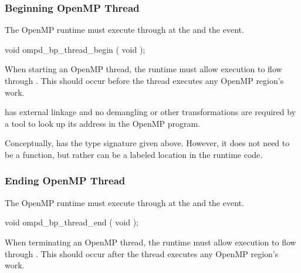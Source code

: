 \subsubsection{Beginning OpenMP Thread}
\label{subsubsec:ompd_bp_thread_begin}

\summary
The OpenMP runtime must execute through
 at the  and the  event.


\begin{cspecific}
\begin{ompSyntax}
void ompd_bp_thread_begin ( void );
\end{ompSyntax}
\end{cspecific}


\descr

When starting an OpenMP thread, the runtime must allow execution
to flow through .
This should occur before the thread executes any OpenMP region's work.

\restrictions

 has external  linkage and no
demangling or other transformations are required by a tool
to look up its address in the OpenMP program.

Conceptually,  has the type signature
given above.
However, it does not need to be a function, but rather can be a labeled location
in the runtime code.

\subsubsection{Ending OpenMP Thread}
\label{subsubsec:ompd_bp_thread_begin}

\summary
The OpenMP runtime must execute through
 at the  and the  event.


\begin{cspecific}
\begin{ompSyntax}
void ompd_bp_thread_end ( void );
\end{ompSyntax}
\end{cspecific}


\descr

When terminating an OpenMP thread, the runtime must allow execution
to flow through .
This should occur after the thread executes any OpenMP region's work.

